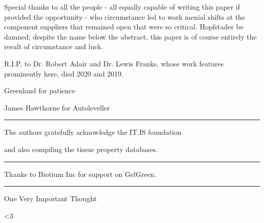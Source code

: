 \documentclass[paper.tex]{subfiles}
\begin{document}
Special thanks to all the people - all equally capable of writing this paper if provided the opportunity - who circumstance led to work menial shifts at the component suppliers that remained open that were so critical. Hopfstader be damned; despite the name below the abstract, this paper is of course entirely the result of circumstance and luck. 

R.I.P. to Dr. Robert Adair and Dr. Lewis Franks, whose work features prominently here, died 2020 and 2019.

Greenland for patience

James Hawthorne for Autoleveller


\rule{\linewidth}{0.2pt}

The authors gratefully acknowledge the IT.IS foundation 

and also compiling the tissue property databases.


\rule{\linewidth}{0.2pt}

Thanks to Biotium Inc for support on GelGreen.

\rule{\linewidth}{0.2pt}

One Very Important Thought


{\Large {\verbatim <3}}
\end{document}
